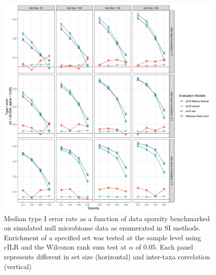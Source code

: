 \documentclass{article}
\begin{document}
\begin{figure}[H]
    \centering
    \includegraphics[scale = 0.4]{figures/fdr_single_sample.png}
    \caption{Median type I error rate as a function of data sparsity benchmarked on simulated null microbiome data as enumerated in SI methods. Enrichment of a specified set was tested at the sample level using cILR and the Wilcoxon rank sum test at $\alpha$ of 0.05. Each panel represents different in set size (horizontal) and inter-taxa correlation (vertical)}
\end{figure}
\end{document}
